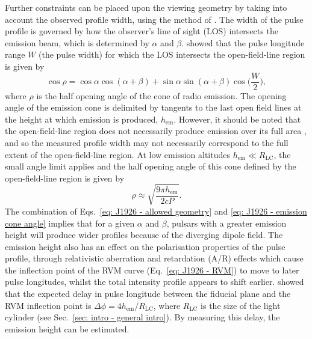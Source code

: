 Further constraints can be placed upon the viewing geometry by taking into account the observed profile width, using the method of \citet{RWJx2015a}. The width of the pulse profile is governed by how the observer's line of sight (LOS) intersects the emission beam, which is determined by $\alpha$ and $\beta$. \citet{GGRx1984} showed that the pulse longitude range $W$ (the pulse width) for which the LOS intersects the open-field-line region is given by 
\begin{equation}
    \label{eq: J1926 - allowed geometry}
    \cos\rho = \cos\alpha\cos(\alpha+\beta)+\sin\alpha\sin(\alpha+\beta)\cos\bigg(\frac{W}{2}\bigg),
\end{equation}
where $\rho$ is the half opening angle of the cone of radio emission. The opening angle of the emission cone is delimited by tangents to the last open field lines at the height at which emission is produced, $h_\mathrm{em}$. However, it should be noted that the open-field-line region does not necessarily produce emission over its full area \citep[e.g][]{LMxx1988}, and so the measured profile width may not necessarily correspond to the full extent of the open-field-line region. At low emission altitudes $h_\mathrm{em} \ll R_\mathrm{LC}$, the small angle limit applies \citep[e.g.][]{Gxxx1981,KDxx1983,Rxxx1990} and the half opening angle of this cone defined by the open-field-line region is given by
\begin{equation}
    \label{eq: J1926 - emission cone angle}
    \rho \approx \sqrt{\frac{9\pi h_\mathrm{em}}{2cP}}.
\end{equation} 
The combination of Eqs.~\eqref{eq: J1926 - allowed geometry} and \eqref{eq: J1926 - emission cone angle} implies that for a given $\alpha$ and $\beta$, pulsars with a greater emission height will produce wider profiles because of the diverging dipole field. The emission height also has an effect on the polarisation properties of the pulse profile, through relativistic aberration and retardation (A/R) effects which cause the inflection point of the RVM curve (Eq.~\eqref{eq: J1926 - RVM}) to move to later pulse longitudes, whilst the total intensity profile appears to shift earlier. \citet{BCWx1991} showed that the expected delay in pulse longitude between the fiducial plane and the RVM inflection point is $\Delta\phi = 4h_\mathrm{em}/R_\mathrm{LC}$, where $R_\mathrm{LC}$ is the size of the light cylinder (see Sec.~\ref{sec: intro - general intro}). By measuring this delay, the emission height can be estimated.

